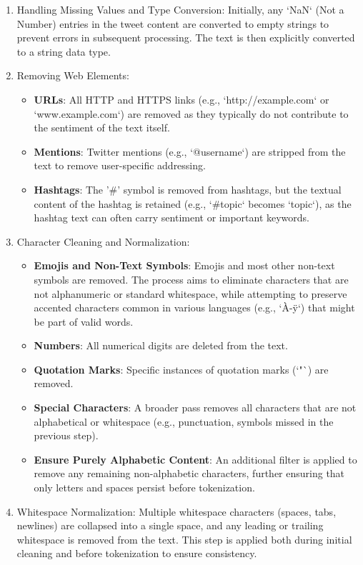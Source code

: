 \begin{enumerate}
    \item Handling Missing Values and Type Conversion: Initially, any `NaN` (Not a Number) entries in the tweet content are converted to empty strings to prevent errors in subsequent processing. The text is then explicitly converted to a string data type.
    \item Removing Web Elements:
     \begin{itemize}
     \item \textbf{URLs}: All HTTP and HTTPS links (e.g., `http://example.com` or `www.example.com`) are removed as they typically do not contribute to the sentiment of the text itself.
     \item \textbf{Mentions}: Twitter mentions (e.g., `@username`) are stripped from the text to remove user-specific addressing.
     \item \textbf{Hashtags}: The '\#' symbol is removed from hashtags, but the textual content of the hashtag is retained (e.g., `\#topic` becomes `topic`), as the hashtag text can often carry sentiment or important keywords.
     \end{itemize}
    \item Character Cleaning and Normalization:
     \begin{itemize}
    \item  \textbf{Emojis and Non-Text Symbols}: Emojis and most other non-text symbols are removed. The process aims to eliminate characters that are not alphanumeric or standard whitespace, while attempting to preserve accented characters common in various languages (e.g., `À-ÿ`) that might be part of valid words.
    \item  \textbf{Numbers}: All numerical digits are deleted from the text.
     \item \textbf{Quotation Marks}: Specific instances of quotation marks (`"`) are removed.
     \item \textbf{Special Characters}: A broader pass removes all characters that are not alphabetical or whitespace (e.g., punctuation, symbols missed in the previous step).
     \item \textbf{Ensure Purely Alphabetic Content}: An additional filter is applied to remove any remaining non-alphabetic characters, further ensuring that only letters and spaces persist before tokenization.
     \end{itemize}
    \item Whitespace Normalization: Multiple whitespace characters (spaces, tabs, newlines) are collapsed into a single space, and any leading or trailing whitespace is removed from the text. This step is applied both during initial cleaning and before tokenization to ensure consistency.

\end{enumerate}

